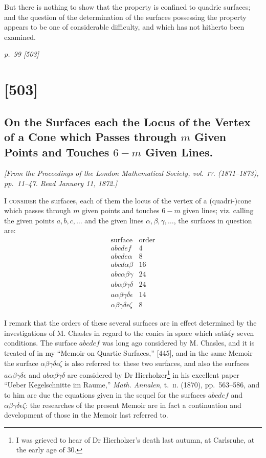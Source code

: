 \documentclass[11pt,a4paper]{article}
\newcommand{\sourcepage}[2]{%
  \bigskip
  \noindent\textit{p.~#1 [#2]}%
  \par\smallskip
}
\newcommand{\papersection}[2]{%
  \section{[#1]}
  \subsection{#2}
}
\newcommand{\fromjournal}[1]{%
  \begin{center}\textit{#1}\end{center}
}
\begin{document}
But there is nothing to show that the property is confined to quadric surfaces; and
the question of the determination of the surfaces possessing the property appears to
be one of considerable difficulty, and which has not hitherto been examined.

\sourcepage{99}{503}
\papersection{503}{On the Surfaces each the Locus of the Vertex of a Cone which Passes through $m$ Given Points and Touches $6-m$ Given Lines.}

\fromjournal{[From the Proceedings of the London Mathematical Society, vol.~\textsc{iv}. (1871--1873), pp.~11--47. Read January 11, 1872.]}

\textsc{I consider} the surfaces, each of them the locus of the vertex of a
(quadri-)cone which passes through $m$ given points and touches $6-m$ given lines;
viz. calling the given points $a,b,c,\ldots$ and the given lines
$\alpha,\beta,\gamma,\ldots$, the surfaces in question are:
\[
\begin{array}{c|c}
\text{surface}&\text{order}\\ \hline
abcdef&4\\
abcde\alpha&8\\
abcd\alpha\beta&16\\
abc\alpha\beta\gamma&24\\
ab\alpha\beta\gamma\delta&24\\
a\alpha\beta\gamma\delta\epsilon&14\\
\alpha\beta\gamma\delta\epsilon\zeta&8
\end{array}
\]

I remark that the orders of these several surfaces are in effect determined by
the investigations of M. Chasles in regard to the conics in space which satisfy
seven conditions. The surface $abcdef$ was long ago considered by M. Chasles, and
it is treated of in my ``Memoir on Quartic Surfaces,'' [445], and in the same Memoir
the surface $\alpha\beta\gamma\delta\epsilon\zeta$ is also referred to: these two
surfaces, and also the surfaces $a\alpha\beta\gamma\delta\epsilon$ and
$ab\alpha\beta\gamma\delta$ are considered by Dr Hierholzer\footnote{I was grieved
to hear of Dr Hierholzer's death last autumn, at Carlsruhe, at the early age of 30.}
in his excellent paper ``Ueber Kegelschnitte im Raume,'' \textit{Math. Annalen},
t.~\textsc{ii}. (1870), pp.~563--586, and to him are due the equations given in the
sequel for the surfaces $abcdef$ and $\alpha\beta\gamma\delta\epsilon\zeta$: the
researches of the present Memoir are in fact a continuation and development of
those in the Memoir last referred to.
\end{document}
